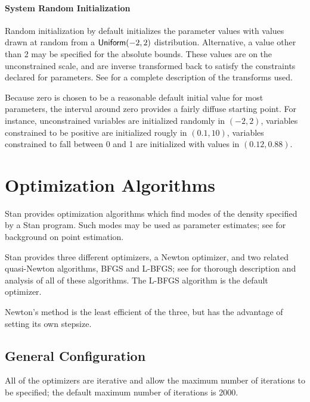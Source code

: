 \subsubsection{System Random Initialization}

Random initialization by default initializes the parameter values with
values drawn at random from a $\distro{Uniform}(-2,2)$ distribution.
Alternative, a value other than 2 may be specified for the absolute
bounds. These values are on the unconstrained scale, and are inverse
transformed back to satisfy the constraints declared for parameters.
See  for a complete description of the
transforms used.  

Because zero is chosen to be a reasonable default initial value for
most parameters, the interval around zero provides a fairly diffuse
starting point. For instance, unconstrained variables are initialized
randomly in $(-2,2)$, variables constrained to be positive are
initialized rougly in $(0.1,10)$, variables constrained to fall
between 0 and 1 are initialized with values in $(0.12,0.88)$.



\chapter{Optimization  Algorithms}%
\label{optimization-algorithms.chapter}

\noindent
Stan provides optimization algorithms which find modes of the density
specified by a Stan program. Such modes may be used as parameter
estimates; see  for background on point estimation.

Stan provides three different optimizers, a Newton optimizer, and two
related quasi-Newton algorithms, BFGS and L-BFGS; see
\citep{NocedalWright:2006} for thorough description and analysis of
all of these algorithms. The L-BFGS algorithm is the default
optimizer.

Newton's method is the least efficient of the three, but has the
advantage of setting its own stepsize. 

\section{General Configuration}

All of the optimizers are iterative and allow the maximum number of
iterations to be specified;  the default maximum number of iterations
is 2000.  

